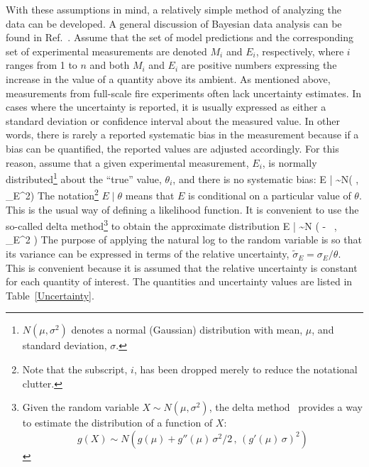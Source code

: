 With these assumptions in mind, a relatively simple method of analyzing the data can be developed.
A general discussion of Bayesian data analysis can be found in
Ref.~\cite{Gelman:Stats}.
Assume that the set of model predictions and the corresponding set of experimental measurements are denoted
$M_i$ and $E_i$, respectively, where $i$ ranges from 1 to $n$ and both $M_i$ and $E_i$ are positive numbers
expressing the increase in the value of a quantity above its ambient.
As mentioned above, measurements from full-scale fire experiments often lack uncertainty estimates. In cases where the uncertainty is
reported, it is usually expressed as either a standard deviation or confidence interval about the measured value. In other words, there is rarely
a reported systematic bias in the measurement because if a bias can be quantified, the reported values are adjusted accordingly.
For this reason, assume that a given experimental measurement, $E_i$, is normally
distributed\footnote{$N(\mu,\sigma^2)$ denotes a normal (Gaussian) distribution
with mean, $\mu$, and standard deviation, $\sigma$.} about the ``true'' value, $\theta_i$, and there is no systematic bias:
\be
   E \; | \; \theta \sim N(\theta \; , \; \sigma_E^2) \label{expunc}
\ee
The notation\footnote{Note that the subscript, $i$, has been dropped merely to reduce the notational clutter.}
$E \; | \; \theta$ means that $E$ is conditional on a particular value of $\theta$.
This is the usual way of defining a likelihood function.
It is convenient to use the so-called delta method\footnote{Given the random variable $X \sim N(\mu,\sigma^2)$, the
delta method~\cite{Oehlert:1992} provides a way to estimate the distribution of a function of $X$:
$$g(X) \sim N \left( g(\mu) + g''(\mu) \, \sigma^2/2 \, , \, (g'(\mu) \, \sigma)^2\right)$$} to obtain the approximate distribution
\be
   \ln E \; | \; \theta \sim N \left( \ln \theta -  \, , \,\widetilde{\sigma}_E^2 \right) \label{eeq}
\ee
The purpose of applying the natural log to the random variable is so that its variance can be expressed in terms of the
relative uncertainty, $\widetilde{\sigma}_E=\sigma_E/\theta$. This is convenient because it is assumed that the relative
uncertainty is constant for each quantity of interest. The quantities and uncertainty values are listed in Table~\ref{Uncertainty}.

